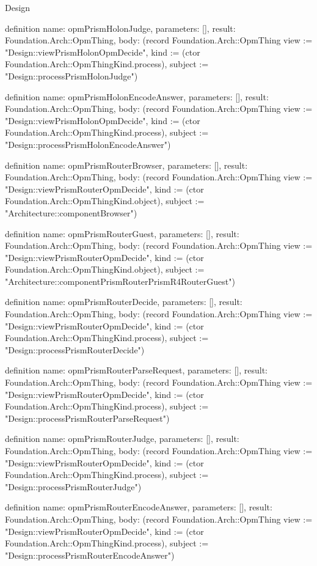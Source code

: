 \begin{lexlean}{Design}
\begin{semanticmodule}
definition{
  name: opmPrismHolonJudge,
  parameters: [],
  result: Foundation.Arch::OpmThing,
  body: (record Foundation.Arch::OpmThing {view := "Design::viewPrismHolonOpmDecide", kind := (ctor Foundation.Arch::OpmThingKind.process), subject := "Design::processPrismHolonJudge"})
}

definition{
  name: opmPrismHolonEncodeAnswer,
  parameters: [],
  result: Foundation.Arch::OpmThing,
  body: (record Foundation.Arch::OpmThing {view := "Design::viewPrismHolonOpmDecide", kind := (ctor Foundation.Arch::OpmThingKind.process), subject := "Design::processPrismHolonEncodeAnswer"})
}

definition{
  name: opmPrismRouterBrowser,
  parameters: [],
  result: Foundation.Arch::OpmThing,
  body: (record Foundation.Arch::OpmThing {view := "Design::viewPrismRouterOpmDecide", kind := (ctor Foundation.Arch::OpmThingKind.object), subject := "Architecture::componentBrowser"})
}

definition{
  name: opmPrismRouterGuest,
  parameters: [],
  result: Foundation.Arch::OpmThing,
  body: (record Foundation.Arch::OpmThing {view := "Design::viewPrismRouterOpmDecide", kind := (ctor Foundation.Arch::OpmThingKind.object), subject := "Architecture::componentPrismRouterPrismR4RouterGuest"})
}

definition{
  name: opmPrismRouterDecide,
  parameters: [],
  result: Foundation.Arch::OpmThing,
  body: (record Foundation.Arch::OpmThing {view := "Design::viewPrismRouterOpmDecide", kind := (ctor Foundation.Arch::OpmThingKind.process), subject := "Design::processPrismRouterDecide"})
}

definition{
  name: opmPrismRouterParseRequest,
  parameters: [],
  result: Foundation.Arch::OpmThing,
  body: (record Foundation.Arch::OpmThing {view := "Design::viewPrismRouterOpmDecide", kind := (ctor Foundation.Arch::OpmThingKind.process), subject := "Design::processPrismRouterParseRequest"})
}

definition{
  name: opmPrismRouterJudge,
  parameters: [],
  result: Foundation.Arch::OpmThing,
  body: (record Foundation.Arch::OpmThing {view := "Design::viewPrismRouterOpmDecide", kind := (ctor Foundation.Arch::OpmThingKind.process), subject := "Design::processPrismRouterJudge"})
}

definition{
  name: opmPrismRouterEncodeAnswer,
  parameters: [],
  result: Foundation.Arch::OpmThing,
  body: (record Foundation.Arch::OpmThing {view := "Design::viewPrismRouterOpmDecide", kind := (ctor Foundation.Arch::OpmThingKind.process), subject := "Design::processPrismRouterEncodeAnswer"})
}


\end{semanticmodule}
\end{lexlean}
